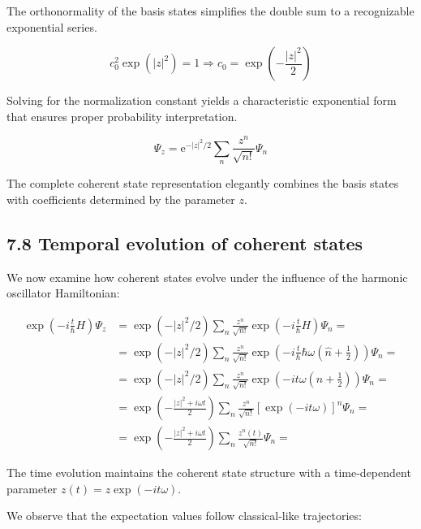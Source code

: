 \documentclass[italian]{HKNdocument}
\begin{document}
The orthonormality of the basis states simplifies the double sum to a recognizable exponential series.

\begin{equation*}
c_{0}^{2} \exp \left(|z|^{2}\right)=1 \Longrightarrow c_{0}=\exp \left(-\frac{|z|^{2}}{2}\right) \tag{7.87}
\end{equation*}

Solving for the normalization constant yields a characteristic exponential form that ensures proper probability interpretation.

\begin{equation*}
\Psi_{z}=\mathrm{e}^{-|z|^{2} / 2} \sum_{n} \frac{z^{n}}{\sqrt{n!}} \Psi_{n} \tag{7.88}
\end{equation*}

The complete coherent state representation elegantly combines the basis states with coefficients determined by the parameter $z$.

\subsection*{7.8 Temporal evolution of coherent states}
We now examine how coherent states evolve under the influence of the harmonic oscillator Hamiltonian:

\begin{align*}
\exp \left(-i \frac{t}{\hbar} H\right) \Psi_{z} & =\exp \left(-|z|^{2} / 2\right) \sum_{n} \frac{z^{n}}{\sqrt{n!}} \exp \left(-i \frac{t}{\hbar} H\right) \Psi_{n}= \\
& =\exp \left(-|z|^{2} / 2\right) \sum_{n} \frac{z^{n}}{\sqrt{n!}} \exp \left(-i \frac{t}{\hbar} \hbar \omega\left(\hat{n}+\frac{1}{2}\right)\right) \Psi_{n}= \\
& =\exp \left(-|z|^{2} / 2\right) \sum_{n} \frac{z^{n}}{\sqrt{n!}} \exp \left(-i t \omega\left(n+\frac{1}{2}\right)\right) \Psi_{n}= \\
& =\exp \left(-\frac{|z|^{2}+i \omega t}{2}\right) \sum_{n} \frac{z^{n}}{\sqrt{n!}}[\exp (-i t \omega)]^{n} \Psi_{n}= \\
& =\exp \left(-\frac{|z|^{2}+i \omega t}{2}\right) \sum_{n} \frac{z^{n}(t)}{\sqrt{n!}} \Psi_{n}= \tag{7.89}
\end{align*}

The time evolution maintains the coherent state structure with a time-dependent parameter $z(t)=z \exp (-i t \omega)$.

We observe that the expectation values follow classical-like trajectories:
\end{document}
